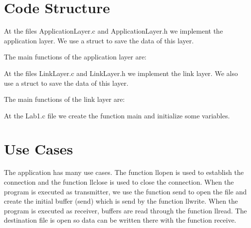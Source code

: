 \documentclass[a4paper]{article}
\begin{document}
\section{Code Structure}
At the files ApplicationLayer.c and ApplicationLayer.h we implement the application layer. We use a struct to save the data of this layer.


The main functions of the application layer are:


At the files LinkLayer.c and LinkLayer.h we implement the link layer. We also use a struct to save the data of this layer.


The main functions of the link layer are:


At the Lab1.c file we create the function main and initialize some variables.

\section{Use Cases}

The application has many use cases. The function llopen is used to establish the connection and the function llclose is used to close the connection. When the program is executed as transmitter, we use the function send to open the file and create the initial buffer (send) which is send by the function llwrite. When the program is executed as receiver, buffers are read through the function llread. The destination file is open so data can be written there with the function receive.
\end{document}
